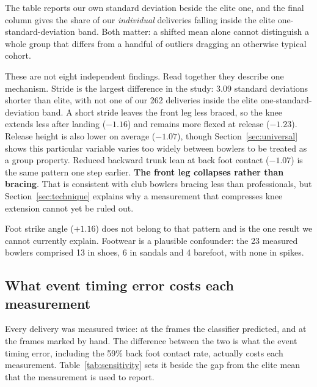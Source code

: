 \documentclass[11pt,a4paper]{article}
\begin{document}
The table reports our own standard deviation beside the elite one, and the
final column gives the share of our \emph{individual} deliveries falling inside
the elite one-standard-deviation band. Both matter: a shifted mean alone cannot
distinguish a whole group that differs from a handful of outliers dragging an
otherwise typical cohort.

These are not eight independent findings. Read together they describe one
mechanism. Stride is the largest difference in the study: 3.09 standard
deviations shorter than elite, with not one of our 262 deliveries inside the
elite one-standard-deviation band. A short stride leaves the front leg less
braced, so the knee extends less after landing ($-1.16$) and remains more
flexed at release ($-1.23$). Release height is also lower on average ($-1.07$),
though Section~\ref{sec:universal} shows this particular variable varies too
widely between bowlers to be treated as a group property. Reduced backward
trunk lean at back foot contact ($-1.07$) is the same pattern one step earlier.
\textbf{The front leg collapses rather than bracing}. That is consistent with
club bowlers bracing less than professionals, but Section~\ref{sec:technique}
explains why a measurement that compresses knee extension cannot yet be ruled
out.

Foot strike angle ($+1.16$) does not belong to that pattern and is the one
result we cannot currently explain. Footwear is a plausible confounder: the 23
measured bowlers comprised 13 in shoes, 6 in sandals and 4 barefoot, with none
in spikes.

\subsection{What event timing error costs each measurement}
\label{sec:sensitivity}

Every delivery was measured twice: at the frames the classifier predicted, and
at the frames marked by hand. The difference between the two is what the
event timing error, including the 59\% back foot contact rate, actually costs
each measurement. Table~\ref{tab:sensitivity} sets it beside the gap from the
elite mean that the measurement is used to report.
\end{document}
